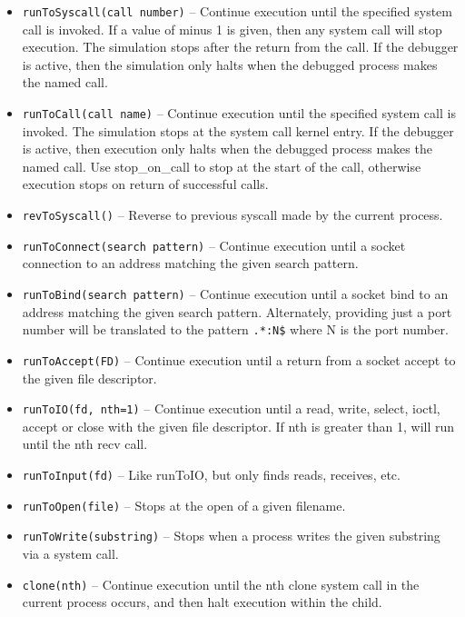 \documentclass[titlepage]{article}
\begin{document}
\begin{itemize}
\item {\tt runToSyscall(call number)} – Continue execution until the specified system call is invoked.  If a value of minus 1 is given, then any system call will stop execution.  The simulation stops after the return from the call.  If the debugger is active, then the simulation only halts when the debugged process makes the named call.

\item {\tt runToCall(call name)} – Continue execution until the specified system call is invoked.  The simulation stops at the system call kernel entry.
If the debugger is active, then execution only halts when the debugged process makes the named call.  Use stop\_on\_call to stop at the start of the call,
otherwise execution stops on return of successful calls.

\item {\tt revToSyscall()} -- Reverse to previous syscall made by the current process.

\item {\tt runToConnect(search pattern)} – Continue execution until a socket connection to an address matching the given search pattern.

\item {\tt runToBind(search pattern)} – Continue execution until a socket bind to an address matching the given search pattern.  Alternately, providing just
a port number will be translated to the pattern {\tt .*:N\$} where N is the port number.

\item {\tt runToAccept(FD)} – Continue execution until a return from a socket accept to the given file descriptor.

\item {\tt runToIO(fd, nth=1)} – Continue execution until a read, write, select, ioctl, accept or close with the given file descriptor.  
If nth is greater than 1, will run until the nth recv call.  

\item {\tt runToInput(fd)} -- Like runToIO, but only finds reads, receives, etc.

\item {\tt runToOpen(file)} -- Stops at the open of a given filename.

\item {\tt runToWrite(substring)} -- Stops when a process writes the given substring via a system call.

\item {\tt clone(nth)} – Continue execution until the nth clone system call in the current process occurs, and then halt execution within the child.


\end{itemize}
\end{document}
